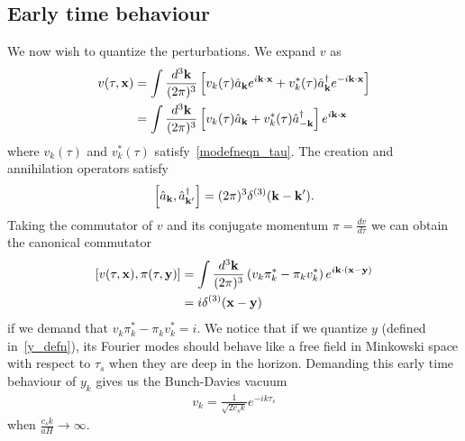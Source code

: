     \subsection{Early time behaviour}
    We now wish to quantize the perturbations. We expand $v$ as
    \begin{align}\label{operator_expansion}
        v(\tau,\mathbf{x}) &= \int\frac{d^3\mathbf{k}}{(2\pi)^3}\left[
            v_k(\tau)\hat{a}_{\mathbf{k}} e^{i\mathbf{k}\cdot\mathbf{x}}+
            v^*_k(\tau)\hat{a}^{\dagger}_{\mathbf{k}} e^{-i\mathbf{k}\cdot\mathbf{x}}
        \right]\\
            &= \int\frac{d^3\mathbf{k}}{(2\pi)^3}\left[
            v_k(\tau)\hat{a}_{\mathbf{k}} +
            v^*_k(\tau)\hat{a}^{\dagger}_{-\mathbf{k}}
        \right]e^{i\mathbf{k}\cdot\mathbf{x}}
    \end{align}
    where $v_k(\tau)$ and $v^*_k(\tau)$ satisfy~\eqref{modefneqn_tau}.
    The creation and annihilation operators satisfy
    \begin{align}\label{creation_annihilation_commutator}
        \left[\hat{a}_{\mathbf{k}},\hat{a}^{\dagger}_{\mathbf{k}'}\right] = (2\pi)^3\delta^{(3)}(\mathbf{k}-\mathbf{k}').
    \end{align}
    Taking the commutator of $v$ and its conjugate momentum $\pi=\frac{dv}{d\tau}$
    we can obtain the canonical commutator
    \begin{align}
        \left[v(\tau,\mathbf{x}),\pi(\tau,\mathbf{y})\right] &=
        \int \frac{d^3 \mathbf{k}}{(2\pi)^3}\left(v_k\pi^*_k-\pi_kv^*_k\right)e^{i\mathbf{k}\cdot(\mathbf{x}-\mathbf{y})}\\
        &= i \delta^{(3)}(\mathbf{x}-\mathbf{y})
    \end{align}
    if we demand that $v_k\pi^*_k-\pi_kv^*_k=i$.
    We notice that if we quantize $y$
    (defined in~\eqref{y_defn}), its Fourier modes
    should behave like a free field in Minkowski space with respect to $\tau_s$
    when they are deep in the horizon.
    Demanding this early time behaviour of $y_k$
    gives us the Bunch-Davies vacuum
    \begin{align}\label{bd_ic}
        v_k = \frac{1}{\sqrt{2{c_s}k}}e^{-ik\tau_s}
    \end{align}
    when $\frac{{c_s}k}{aH}\rightarrow \infty$.


